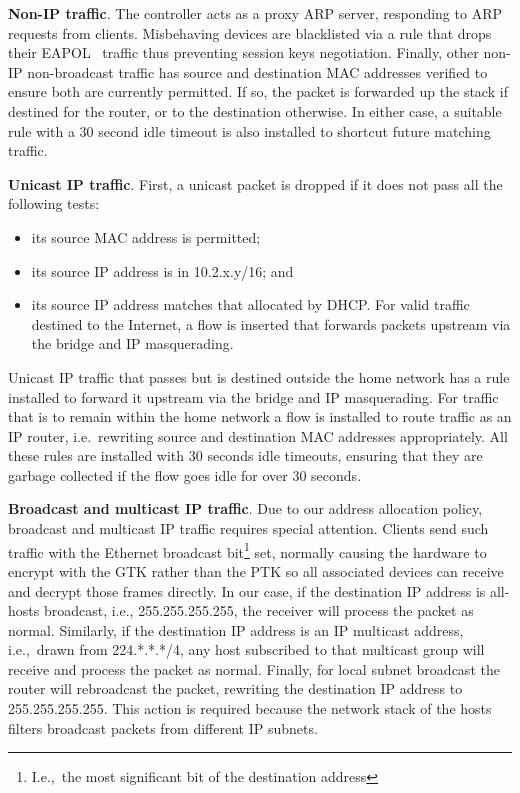 \textbf{Non-IP traffic}.  The controller acts as a proxy ARP server, responding
to ARP requests from clients.  Misbehaving devices are blacklisted via a rule
that drops their EAPOL~ traffic thus preventing session keys
negotiation.
Finally, other non-IP non-broadcast traffic has source and destination MAC addresses verified
to ensure both are currently permitted.  If so, the packet is forwarded up the
stack if destined for the router, or to the destination otherwise.  In either
case, a suitable \of rule with a 30 second idle timeout is also installed to
shortcut future matching traffic.

\textbf{Unicast IP traffic}.  First, a unicast packet is dropped if it does not
pass all the following tests: 
\begin{itemize}
    \item its source MAC address is permitted; 
    \item its source IP address is in 10.2.x.y/16; and
    \item its source IP address matches that allocated by DHCP\@.  For valid
      traffic destined to the Internet, a flow is inserted that forwards packets
      upstream via the bridge and IP masquerading.  
\end{itemize} 
Unicast IP traffic that passes but is destined outside the home network has a
rule installed to forward it upstream via the bridge and IP masquerading.  For
traffic that is to remain within the home network a flow is installed to route
traffic as an IP router, i.e.~rewriting source and destination MAC addresses
appropriately.  All these rules are installed with 30 seconds idle timeouts, ensuring
that they are garbage collected if the flow goes idle for over 30 seconds.

\textbf{Broadcast and multicast IP traffic}.  Due to our address allocation
policy, broadcast and multicast IP traffic requires special attention.  Clients
send such traffic with the Ethernet broadcast bit\footnote{I.e.,~the most
  significant bit of the destination address} set, normally causing the hardware
to encrypt with the GTK rather than the PTK so all associated devices can
receive and decrypt those frames directly.  In our case, if the destination IP
address is all-hosts broadcast, i.e., 255.255.255.255, the receiver will process
the packet as normal.  Similarly, if the destination IP address is an IP
multicast address, i.e.,~drawn from 224.*.*.*/4, any host subscribed to that
multicast group will receive and process the packet as normal. Finally, for
local subnet broadcast the router will rebroadcast the packet, rewriting the
destination IP address to 255.255.255.255. This action is required because the
network stack of the hosts filters broadcast packets from different IP subnets.

